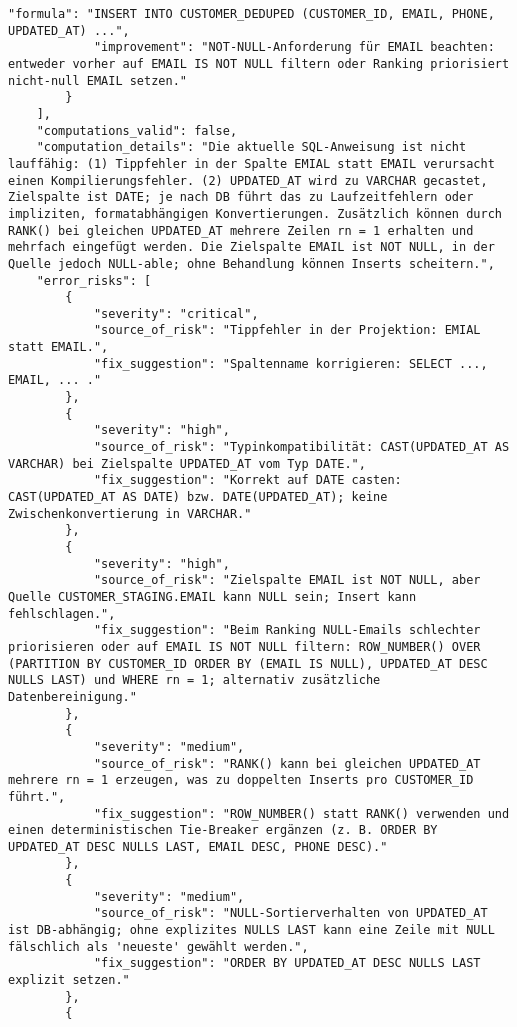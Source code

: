 \begin{lstlisting}[caption={Ausgabe: GPT-5 Anwendungsfall 2 Robustheitsdurchlauf},label={gpt_case2_prompt3}]
            "formula": "INSERT INTO CUSTOMER_DEDUPED (CUSTOMER_ID, EMAIL, PHONE, UPDATED_AT) ...",
            "improvement": "NOT-NULL-Anforderung für EMAIL beachten: entweder vorher auf EMAIL IS NOT NULL filtern oder Ranking priorisiert nicht-null EMAIL setzen."
        }
    ],
    "computations_valid": false,
    "computation_details": "Die aktuelle SQL-Anweisung ist nicht lauffähig: (1) Tippfehler in der Spalte EMIAL statt EMAIL verursacht einen Kompilierungsfehler. (2) UPDATED_AT wird zu VARCHAR gecastet, Zielspalte ist DATE; je nach DB führt das zu Laufzeitfehlern oder impliziten, formatabhängigen Konvertierungen. Zusätzlich können durch RANK() bei gleichen UPDATED_AT mehrere Zeilen rn = 1 erhalten und mehrfach eingefügt werden. Die Zielspalte EMAIL ist NOT NULL, in der Quelle jedoch NULL-able; ohne Behandlung können Inserts scheitern.",
    "error_risks": [
        {
            "severity": "critical",
            "source_of_risk": "Tippfehler in der Projektion: EMIAL statt EMAIL.",
            "fix_suggestion": "Spaltenname korrigieren: SELECT ..., EMAIL, ... ."
        },
        {
            "severity": "high",
            "source_of_risk": "Typinkompatibilität: CAST(UPDATED_AT AS VARCHAR) bei Zielspalte UPDATED_AT vom Typ DATE.",
            "fix_suggestion": "Korrekt auf DATE casten: CAST(UPDATED_AT AS DATE) bzw. DATE(UPDATED_AT); keine Zwischenkonvertierung in VARCHAR."
        },
        {
            "severity": "high",
            "source_of_risk": "Zielspalte EMAIL ist NOT NULL, aber Quelle CUSTOMER_STAGING.EMAIL kann NULL sein; Insert kann fehlschlagen.",
            "fix_suggestion": "Beim Ranking NULL-Emails schlechter priorisieren oder auf EMAIL IS NOT NULL filtern: ROW_NUMBER() OVER (PARTITION BY CUSTOMER_ID ORDER BY (EMAIL IS NULL), UPDATED_AT DESC NULLS LAST) und WHERE rn = 1; alternativ zusätzliche Datenbereinigung."
        },
        {
            "severity": "medium",
            "source_of_risk": "RANK() kann bei gleichen UPDATED_AT mehrere rn = 1 erzeugen, was zu doppelten Inserts pro CUSTOMER_ID führt.",
            "fix_suggestion": "ROW_NUMBER() statt RANK() verwenden und einen deterministischen Tie-Breaker ergänzen (z. B. ORDER BY UPDATED_AT DESC NULLS LAST, EMAIL DESC, PHONE DESC)."
        },
        {
            "severity": "medium",
            "source_of_risk": "NULL-Sortierverhalten von UPDATED_AT ist DB-abhängig; ohne explizites NULLS LAST kann eine Zeile mit NULL fälschlich als 'neueste' gewählt werden.",
            "fix_suggestion": "ORDER BY UPDATED_AT DESC NULLS LAST explizit setzen."
        },
        {

\end{lstlisting}
